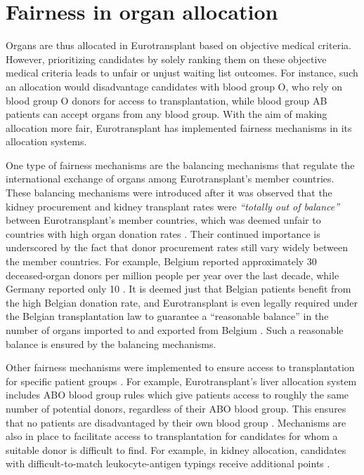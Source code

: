 \documentclass[11pt,twoside,]{book}
\begin{document}
\section{Fairness in organ allocation}\label{fairness-in-organ-allocation}

\vspace*{-1em}

Organs are thus allocated in Eurotransplant based on objective medical criteria.
However, prioritizing candidates by solely ranking them on these objective
medical criteria leads to unfair or unjust waiting list outcomes. For instance,
such an allocation would disadvantage candidates with blood group O, who rely on
blood group O donors for access to transplantation, while blood group AB patients
can accept organs from any blood group. With the aim of making allocation more fair,
Eurotransplant has implemented fairness mechanisms in its allocation systems.

One type of fairness mechanisms are the balancing mechanisms that regulate the
international exchange of organs among Eurotransplant's member countries. These
balancing mechanisms were introduced after it was observed that the kidney procurement
and kidney transplant rates were \emph{``totally out of balance''} between Eurotransplant's
member countries, which was deemed unfair to countries with high organ donation rates
\citep{persijnEurotransplantKidneyAllocation2000}. Their continued importance
is underscored by the fact that donor procurement rates still
vary widely between the member countries. For example, Belgium reported
approximately 30 deceased-organ donors per million people per year over the last decade,
while Germany reported only 10 \citep{et_donor_pmp}.
It is deemed just that Belgian patients benefit from the high Belgian donation rate,
and Eurotransplant is even legally required under the Belgian transplantation law
to guarantee a ``reasonable balance'' in the number of organs imported to and exported
from Belgium \citep{BelgischeWet1986}. Such a reasonable balance is ensured by the
balancing mechanisms.

Other fairness mechanisms were implemented to ensure access to transplantation
for specific patient groups \citep{DeMeester1999}. For example, Eurotransplant's liver
allocation system includes ABO blood group rules which give patients access to
roughly the same number of potential donors, regardless of their ABO blood group. This ensures
that no patients are disadvantaged by their own blood group \citep{demeesterWhichABOmatchingRule2002}.
Mechanisms are also in place to facilitate access to transplantation for candidates
for whom a suitable donor is difficult to find. For example, in kidney allocation,
candidates with difficult-to-match leukocyte-antigen typings receive additional
points \citep{demeesterNewEurotransplantKidney1998}.
\end{document}
